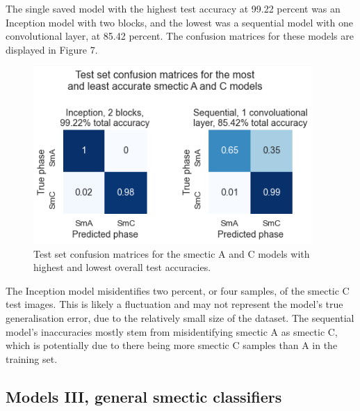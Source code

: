\documentclass[12pt]{article}
\begin{document}
The single saved model with the highest test accuracy at 99.22 percent was an Inception model with two blocks, and the lowest was a sequential model with one convolutional layer, at 85.42 percent. The confusion matrices for these models are displayed in Figure 7.
\begin{figure}[!ht]
	\centering
    \includegraphics[width=4.174in]{images/confusion_matrix_2.png}
    \caption{Test set confusion matrices for the smectic A and C models with highest and lowest overall test accuracies.}
\end{figure} 
The Inception model misidentifies two percent, or four samples, of the smectic C test images. This is likely a fluctuation and may not represent the model's true generalisation error, due to the relatively small size of the dataset. The sequential model's inaccuracies mostly stem from misidentifying smectic A as smectic C, which is potentially due to there being more smectic C samples than A in the training set. 
\subsection{Models III, general smectic classifiers}
\end{document}
